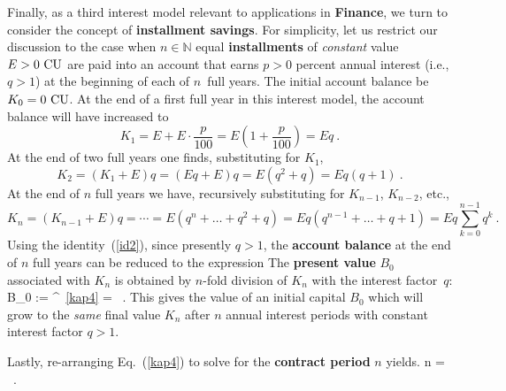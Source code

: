 \medskip
\noindent
Finally, as a third interest model relevant to applications in 
{\bf Finance}, we turn to consider the concept of {\bf installment 
savings}. For simplicity, let us restrict our discussion to the 
case when $n \in \mathbb{N}$ equal {\bf installments} of 
\emph{constant} value $E>0~{\rm CU}$ are paid into an account that 
earns $p>0$ percent annual interest (i.e., $q>1$) at the beginning 
of each of $n$~full years. The initial account balance be 
$K_{0}=0~{\rm CU}$. At the end of a first full year in this 
interest model, the account balance will have increased to
%
\[
K_{1} = E + E\cdot\frac{p}{100}
= E\left(1+\frac{p}{100}\right)
= Eq \ .
\]
%
At the end of two full years one finds, substituting for $K_{1}$,
%
\[
K_{2} = (K_{1}+E)q = (Eq+E)q = E(q^{2}+q) = Eq(q+1) \ .
\]
%
At the end of $n$ full years we have, recursively substituting for $K_{n-1}$, $K_{n-2}$, etc.,
%
\[
K_{n} = (K_{n-1}+E)q
= \cdots
=E(q^{n}+\ldots+q^{2}+q)
=Eq(q^{n-1}+\ldots+q+1)
= Eq\sum_{k=0}^{n-1}q^{k} \ .
\]
%
Using the identity~(\ref{id2}), since presently $q>1$, the {\bf 
account balance} at the end of $n$ full years can be reduced to 
the expression
%
\be
{}
\ee
%
The {\bf present value} $B_{0}$ associated with $K_{n}$ is 
obtained by $n$-fold division of $K_{n}$ with the interest 
factor~$q$:
%
\be
B_{0} := 
\overbrace{=}^{~\ref{kap4}}
 =  \ .
\ee
%
This gives the value of an initial capital $B_{0}$ which will grow 
to the \emph{same} final value $K_{n}$ after $n$ annual interest 
periods with constant interest factor $q>1$.

\medskip
\noindent
Lastly, re-arranging Eq.~(\ref{kap4}) to solve for the {\bf 
contract period} $n$ yields.
%
\be
n =  \ .
\ee
%

